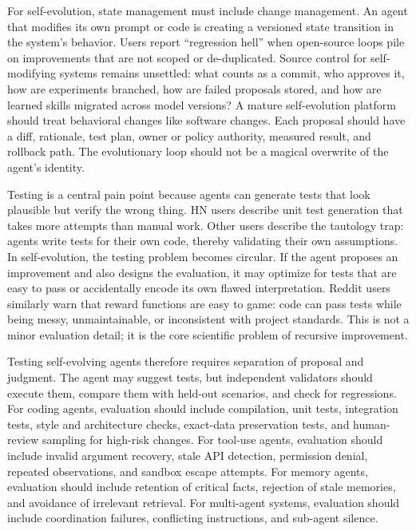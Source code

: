 For self-evolution, state management must include change management. An agent that modifies its own prompt or code is creating a versioned state transition in the system's behavior. Users report ``regression hell'' when open-source loops pile on improvements that are not scoped or de-duplicated. Source control for self-modifying systems remains unsettled: what counts as a commit, who approves it, how are experiments branched, how are failed proposals stored, and how are learned skills migrated across model versions? A mature self-evolution platform should treat behavioral changes like software changes. Each proposal should have a diff, rationale, test plan, owner or policy authority, measured result, and rollback path. The evolutionary loop should not be a magical overwrite of the agent's identity.

Testing is a central pain point because agents can generate tests that look plausible but verify the wrong thing. HN users describe unit test generation that takes more attempts than manual work. Other users describe the tautology trap: agents write tests for their own code, thereby validating their own assumptions. In self-evolution, the testing problem becomes circular. If the agent proposes an improvement and also designs the evaluation, it may optimize for tests that are easy to pass or accidentally encode its own flawed interpretation. Reddit users similarly warn that reward functions are easy to game: code can pass tests while being messy, unmaintainable, or inconsistent with project standards. This is not a minor evaluation detail; it is the core scientific problem of recursive improvement.

Testing self-evolving agents therefore requires separation of proposal and judgment. The agent may suggest tests, but independent validators should execute them, compare them with held-out scenarios, and check for regressions. For coding agents, evaluation should include compilation, unit tests, integration tests, style and architecture checks, exact-data preservation tests, and human-review sampling for high-risk changes. For tool-use agents, evaluation should include invalid argument recovery, stale API detection, permission denial, repeated observations, and sandbox escape attempts. For memory agents, evaluation should include retention of critical facts, rejection of stale memories, and avoidance of irrelevant retrieval. For multi-agent systems, evaluation should include coordination failures, conflicting instructions, and sub-agent silence.

